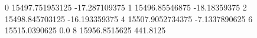 0 15497.751953125 -17.287109375
1 15496.85546875 -18.18359375
2 15498.845703125 -16.193359375
4 15507.9052734375 -7.1337890625
6 15515.0390625 0.0
8 15956.8515625 441.8125

